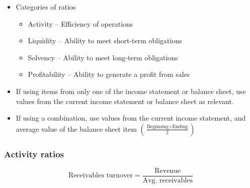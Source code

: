 \documentclass[../notes_compiled.tex]{subfiles}
\begin{document}
\begin{itemize}
\item Categories of ratios
\begin{itemize}
\item Activity -- Efficiency of operations
\item Liquidity -- Ability to meet short-term obligations
\item Solvency -- Ability to meet long-term obligations
\item Profitability -- Ability to generate a profit from sales
\end{itemize}

\item If using items from only one of the income statement or balance sheet, use values from the current income statement or balance sheet as relevant.
\item If using a combination, use values from the current income statement, and average value of the balance sheet item $\left( \frac{\text{Beginning} + \text{Ending}}{2} \right)$
\end{itemize}

\subsubsection{Activity ratios}

\begin{equation*}
\text{Receivables turnover} = \frac{\text{Revenue}}{\text{Avg. receivables}}
\end{equation*}
\end{document}
